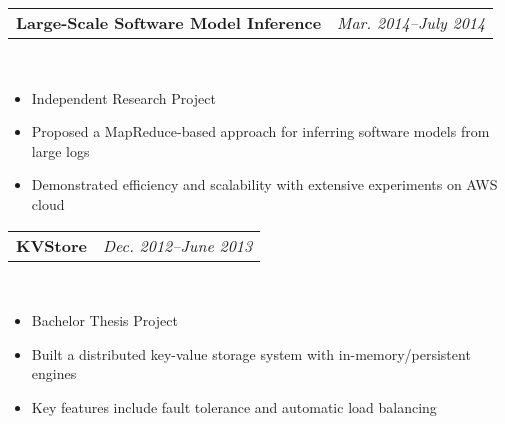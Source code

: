 \documentclass[11pt,a4paper,roman]{moderncv}        %
\makeatletter
\newcommand{\zap}[1]{ }
\newcommand{\cvexpr}[5][1em]{
  \begin{tabular*}{\maincolumnwidth}{l@{\extracolsep{\fill}}r}%
    {\textbf{#3}\ifthenelse{\equal{#4}{}}{}{, #4}} & {\small\itshape#2}%
  \end{tabular*}%
  \\
  \begin{minipage}{\maincolumnwidth}%
        #5%
  \end{minipage}%
  \par\addvspace{#1}
}
\makeatother
\begin{document}
\cvexpr{Mar. 2014--July 2014}{Large-Scale Software Model Inference}{Tsinghua University}{
\begin{itemize}
\item Independent Research Project
\item Proposed a MapReduce-based approach for inferring software models from large logs
\item Demonstrated efficiency and scalability with extensive experiments on AWS cloud
\end{itemize}

}

\zap{
\cvexpr{Sept. 2013--Dec. 2013}{DQCup}{Tsinghua University}{
\begin{itemize}
\item Course Project for \textit{Advanced Topics in Data Quality}
\item Developed a data cleaning tool integrating various data cleaning techniques for a given task
\item Ranked 1st among 15 teams in terms of detection accuracy, repairing accuracy, and performance
\end{itemize}
}
}

\cvexpr{Dec. 2012--June 2013}{KVStore}{Tongji University}{
\begin{itemize}
\item Bachelor Thesis Project
\item Built a distributed key-value storage system with in-memory/persistent engines
\item Key features include fault tolerance and automatic load balancing
\end{itemize}
}
\end{document}
